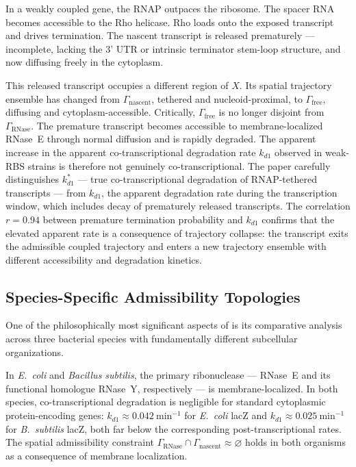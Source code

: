 \documentclass[12pt, a4paper]{article}
\theoremstyle{essaystyle}
\begin{document}
In a weakly coupled gene, the RNAP outpaces the ribosome. The spacer RNA becomes
accessible to the Rho helicase. Rho loads onto the exposed transcript and drives
termination. The nascent transcript is released prematurely --- incomplete, lacking
the 3' UTR or intrinsic terminator stem-loop structure, and now diffusing freely in
the cytoplasm.

This released transcript occupies a different region of $X$. Its spatial trajectory
ensemble has changed from $\Gamma_{\mathrm{nascent}}$, tethered and nucleoid-proximal,
to $\Gamma_{\mathrm{free}}$, diffusing and cytoplasm-accessible. Critically,
$\Gamma_{\mathrm{free}}$ is no longer disjoint from $\Gamma_{\mathrm{RNase}}$. The
premature transcript becomes accessible to membrane-localized RNase~E through normal
diffusion and is rapidly degraded. The apparent increase in the apparent co-transcriptional
degradation rate $k_{d1}$ observed in weak-RBS strains is therefore not genuinely
co-transcriptional. The paper carefully distinguishes $k_{d1}^*$ --- true
co-transcriptional degradation of RNAP-tethered transcripts --- from $k_{d1}$,
the apparent degradation rate during the transcription window, which includes decay of
prematurely released transcripts. The correlation $r = 0.94$ between premature
termination probability and $k_{d1}$ confirms that the elevated apparent rate is a
consequence of trajectory collapse: the transcript exits the admissible coupled
trajectory and enters a new trajectory ensemble with different accessibility and
degradation kinetics.

\subsection{Species-Specific Admissibility Topologies}

One of the philosophically most significant aspects of \citet{kim2026spatial} is its
comparative analysis across three bacterial species with fundamentally different
subcellular organizations.

In \textit{E.~coli} and \textit{Bacillus subtilis}, the primary ribonuclease ---
RNase~E and its functional homologue RNase~Y, respectively --- is membrane-localized.
In both species, co-transcriptional degradation is negligible for standard cytoplasmic
protein-encoding genes: $k_{d1} \approx 0.042 \ \mathrm{min}^{-1}$ for
\textit{E.~coli} lacZ and $k_{d1} \approx 0.025 \ \mathrm{min}^{-1}$ for
\textit{B.~subtilis} lacZ, both far below the corresponding post-transcriptional rates.
The spatial admissibility constraint $\Gamma_{\mathrm{RNase}} \cap
\Gamma_{\mathrm{nascent}} \approx \varnothing$ holds in both organisms as a consequence
of membrane localization.
\end{document}
